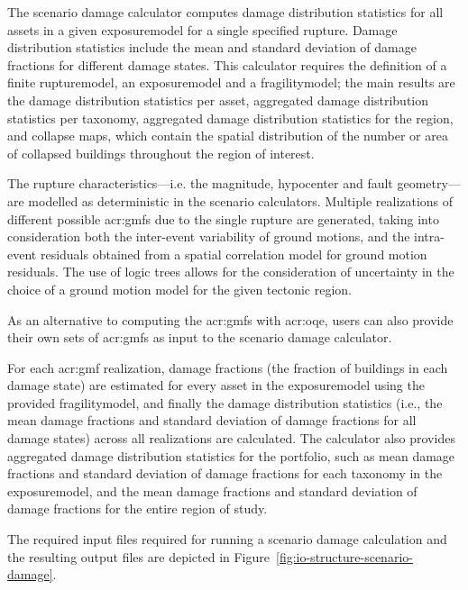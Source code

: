 The scenario damage calculator computes damage distribution statistics for all
\glspl{asset} in a given \gls{exposuremodel} for a single specified
\gls{rupture}. Damage distribution statistics include the mean and standard
deviation of damage fractions for different damage states. This calculator
requires the definition of a finite \gls{rupturemodel}, an \gls{exposuremodel}
and a \gls{fragilitymodel}; the main results are the damage distribution
statistics per \gls{asset}, aggregated damage distribution statistics per
taxonomy, aggregated damage distribution statistics for the region, and
collapse maps, which contain the spatial distribution of the number or area of
collapsed buildings throughout the region of interest.

The \gls{rupture} characteristics---i.e. the magnitude, hypocenter and fault
geometry---are modelled as deterministic in the scenario calculators. Multiple
realizations of different possible \glspl{acr:gmf} due to the single
\gls{rupture} are generated, taking into consideration both the inter-event
variability of ground motions, and the intra-event residuals obtained from a
spatial correlation model for ground motion residuals. The use of logic trees
allows for the consideration of uncertainty in the choice of a ground motion
model for the given tectonic region.

As an alternative to computing the \glspl{acr:gmf} with \glsdesc{acr:oqe},
users can also provide their own sets of \glspl{acr:gmf} as input to the
scenario damage calculator.

For each \gls{acr:gmf} realization, damage fractions (the fraction of
buildings in each damage state) are estimated for every \gls{asset} in the
\gls{exposuremodel} using the provided \gls{fragilitymodel}, and finally the
damage distribution statistics (i.e., the mean damage fractions and standard
deviation of damage fractions for all damage states) across all realizations
are calculated. The calculator also provides aggregated damage distribution
statistics for the portfolio, such as mean damage fractions and standard
deviation of damage fractions for each taxonomy in the \gls{exposuremodel},
and the mean damage fractions and standard deviation of damage fractions for
the entire region of study.

The required input files required for running a scenario damage calculation
and the resulting output files are depicted in Figure~\ref{fig:io-structure-scenario-damage}.

